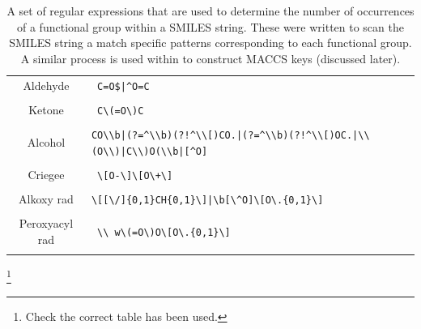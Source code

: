 \begin{table}[H]
\begin{tabular}{c|p{5in}}
Aldehyde & \verb! C=O$|^O=C!\\&\\

Ketone & \verb! C\(=O\)C!\\&\\

Alcohol & \verb-CO\\b|(?=^\\b)(?!^\\[)CO.|(?=^\\b)(?!^\\[)OC.|\\(O\\)|C\\)O(\\b|[^O]-\\&\\

Criegee & \verb! \[O-\]\[O\+\]!\\&\\

Alkoxy rad & \verb!\[[\/]{0,1}CH{0,1}\]|\b[\^O]\[O\.{0,1}\]!\\&\\

Peroxyacyl rad & \verb! \\ w\(=O\)O\[O\.{0,1}\]!\\&\\

    \end{tabular}

    \caption{ A set of regular expressions that are used to determine the number of occurrences of a functional group within a SMILES string. These were written to scan the SMILES string a match specific patterns corresponding to each functional group. A similar process is used within \citep{rdkitcode} to construct MACCS keys (discussed later).}
    \label{tab:fngroups}
\end{table}\footnote{Check the correct table has been used.}



